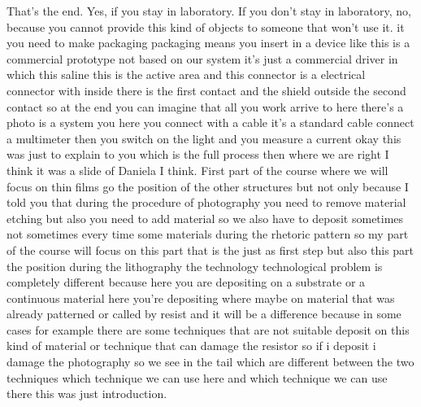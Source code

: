 That's the end. Yes, if you stay in laboratory. If you don't stay in laboratory, no, because you cannot provide this kind of objects to someone that won't use it. it you need to make packaging packaging means you insert in a device like this is a commercial prototype not based on our system it's just a commercial driver in which this saline this is the active area and this connector is a electrical connector with inside there is the first contact and the shield outside the second contact so at the end you can imagine that all you work arrive to here there's a photo is a system you here you connect with a cable it's a standard cable connect a multimeter then you switch on the light and you measure a current okay this was just to explain to you which is the full process then where we are right I think it was a slide of Daniela I think.
First part of the course where we will focus on thin films go the position of the other structures but not only because I told you that during the procedure of photography you need to remove material etching but also you need to add material so we also have to deposit sometimes not sometimes every time some materials during the rhetoric pattern so my part of the course will focus on this part that is the just as first step but also this part the position during the lithography the technology technological problem is completely different because here you are depositing on a substrate or a continuous material here you're depositing where maybe on material that was already patterned or called by resist and it will be a difference because in some cases for example there are some techniques that are not suitable deposit on this kind of material or technique that can damage the resistor so if i deposit i damage the photography so we see in the tail which are different between the two techniques which technique we can use here and which technique we can use there this was just introduction.
